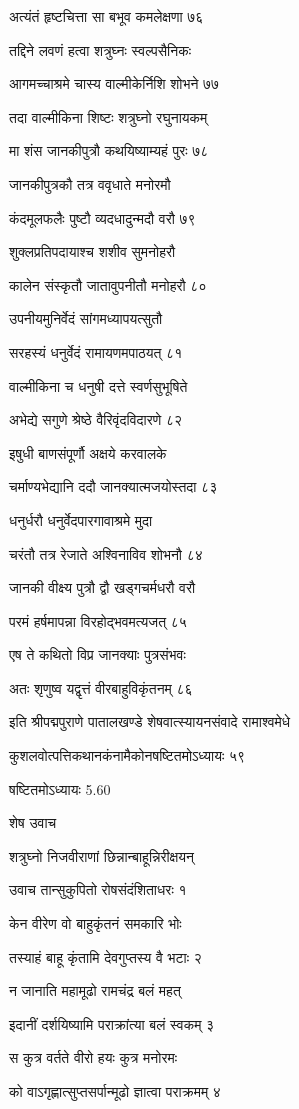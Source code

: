 अत्यंतं हृष्टचित्ता सा बभूव कमलेक्षणा ७६

तद्दिने लवणं हत्वा शत्रुघ्नः स्वल्पसैनिकः

आगमच्चाश्रमे चास्य वाल्मीकेर्निशि शोभने ७७

तदा वाल्मीकिना शिष्टः शत्रुघ्नो रघुनायकम्

मा शंस जानकीपुत्रौ कथयिष्याम्यहं पुरः ७८

जानकीपुत्रकौ तत्र ववृधाते मनोरमौ

कंदमूलफलैः पुष्टौ व्यदधादुन्मदौ वरौ ७९

शुक्लप्रतिपदायाश्च शशीव सुमनोहरौ

कालेन संस्कृतौ जातावुपनीतौ मनोहरौ ८०

उपनीयमुनिर्वेदं सांगमध्यापयत्सुतौ

सरहस्यं धनुर्वेदं रामायणमपाठयत् ८१

वाल्मीकिना च धनुषी दत्ते स्वर्णसुभूषिते

अभेद्ये सगुणे श्रेष्ठे वैरिवृंदविदारणे ८२

इषुधी बाणसंपूर्णौ अक्षये करवालके

चर्माण्यभेद्यानि ददौ जानक्यात्मजयोस्तदा ८३

धनुर्धरौ धनुर्वेदपारगावाश्रमे मुदा

चरंतौ तत्र रेजाते अश्विनाविव शोभनौ ८४

जानकी वीक्ष्य पुत्रौ द्वौ खड्गचर्मधरौ वरौ

परमं हर्षमापन्ना विरहोद्भवमत्यजत् ८५

एष ते कथितो विप्र जानक्याः पुत्रसंभवः

अतः शृणुष्व यद्वृत्तं वीरबाहुविकृंतनम् ८६

इति श्रीपद्मपुराणे पातालखण्डे शेषवात्स्यायनसंवादे रामाश्वमेधे

कुशलवोत्पत्तिकथानकंनामैकोनषष्टितमोऽध्यायः ५९

षष्टितमोऽध्यायः 5.60

शेष उवाच

शत्रुघ्नो निजवीराणां छिन्नान्बाहून्निरीक्षयन्

उवाच तान्सुकुपितो रोषसंदंशिताधरः १

केन वीरेण वो बाहुकृंतनं समकारि भोः

तस्याहं बाहू कृंतामि देवगुप्तस्य वै भटाः २

न जानाति महामूढो रामचंद्र बलं महत्

इदानीं दर्शयिष्यामि पराक्रांत्या बलं स्वकम् ३

स कुत्र वर्तते वीरो हयः कुत्र मनोरमः

को वाऽगृह्णात्सुप्तसर्पान्मूढो ज्ञात्वा पराक्रमम् ४

